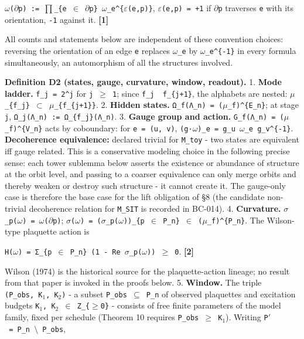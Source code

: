 \documentclass[
  american,
  11pt,
  letterpaper,
]{article}
\begin{document}
\texttt{\ensuremath{\omega}(\ensuremath{\partial}p)\ :=\ \ensuremath{\prod}\_\{e\ \ensuremath{\in}\ \ensuremath{\partial}p\}\ \ensuremath{\omega}\_e\^{}\{\ensuremath{\varepsilon}(e,p)\}}, \texttt{\ensuremath{\varepsilon}(e,p)\ =\ +1} if \texttt{\ensuremath{\partial}p} traverses \texttt{e} with its orientation, \texttt{-1} against it. \textbf{{[}1{]}}

All counts and statements below are independent of these convention choices: reversing the orientation of an edge \texttt{e} replaces \texttt{\ensuremath{\omega}\_e} by \texttt{\ensuremath{\omega}\_e\^{}\{-1\}} in every formula simultaneously, an automorphism of all the structures involved.

\textbf{Definition D2 (states, gauge, curvature, window, readout).} 1. \textbf{Mode ladder.} \texttt{f\_j\ =\ 2\^{}j} for \texttt{j\ \ensuremath{\geq}\ 1}; since \texttt{f\_j\ \textbar{}\ f\_\{j+1\}}, the alphabets are nested: \texttt{\ensuremath{\mu}\_\{f\_j\}\ \ensuremath{\subset}\ \ensuremath{\mu}\_\{f\_\{j+1\}\}}. 2. \textbf{Hidden states.} \texttt{Ω\_f(Λ\_n)\ =\ (\ensuremath{\mu}\_f)\^{}\{E\_n\}}; at stage \texttt{j}, \texttt{Ω\_j(Λ\_n)\ :=\ Ω\_\{f\_j\}(Λ\_n)}. 3. \textbf{Gauge group and action.} \texttt{G\_f(Λ\_n)\ =\ (\ensuremath{\mu}\_f)\^{}\{V\_n\}} acts by coboundary: for \texttt{e\ =\ (u,\ v)}, \texttt{(g·\ensuremath{\omega})\_e\ =\ g\_u\ \ensuremath{\omega}\_e\ g\_v\^{}\{-1\}}. \textbf{Decoherence equivalence:} declared trivial for \texttt{M\_toy} - two states are equivalent iff gauge related. This is a conservative modeling choice in the following precise sense: each tower sublemma below asserts the existence or abundance of structure at the orbit level, and passing to a coarser equivalence can only merge orbits and thereby weaken or destroy such structure - it cannot create it. The gauge-only case is therefore the base case for the lift obligation of §8 (the candidate non-trivial decoherence relation for \texttt{M\_SIT} is recorded in BC-014). 4. \textbf{Curvature.} \texttt{\ensuremath{\sigma}\_p(\ensuremath{\omega})\ =\ \ensuremath{\omega}(\ensuremath{\partial}p)}; \texttt{\ensuremath{\sigma}(\ensuremath{\omega})\ =\ (\ensuremath{\sigma}\_p(\ensuremath{\omega}))\_\{p\ \ensuremath{\in}\ P\_n\}\ \ensuremath{\in}\ (\ensuremath{\mu}\_f)\^{}\{P\_n\}}. The Wilson-type plaquette action is

\texttt{H(\ensuremath{\omega})\ =\ Σ\_\{p\ \ensuremath{\in}\ P\_n\}\ (1\ -\ Re\ \ensuremath{\sigma}\_p(\ensuremath{\omega}))\ \ensuremath{\geq}\ 0}. \textbf{{[}2{]}}

Wilson (1974) is the historical source for the plaquette-action lineage; no result from that paper is invoked in the proofs below. 5. \textbf{Window.} The triple \texttt{(P\_obs,\ K\ensuremath{{}_{1}},\ K\ensuremath{{}_{2}})} - a subset \texttt{P\_obs\ \ensuremath{\subseteq}\ P\_n} of observed plaquettes and excitation budgets \texttt{K\ensuremath{{}_{1}},\ K\ensuremath{{}_{2}}\ \ensuremath{\in}\ Z\_\{\ensuremath{\geq}0\}} - consists of free finite parameters of the model family, fixed per schedule (Theorem 10 requires \texttt{\textbar{}P\_obs\textbar{}\ \ensuremath{\geq}\ K\ensuremath{{}_{1}}}). Writing \texttt{P\ensuremath{'}\ =\ P\_n\ \ensuremath{\setminus}\ P\_obs},
\end{document}
